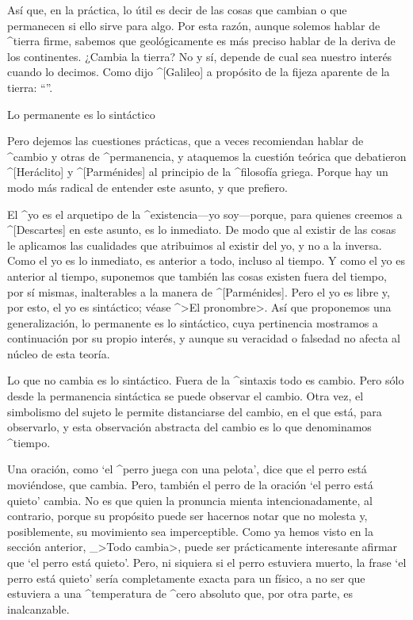 Así que, en la práctica, lo útil es decir de las cosas que cambian o que
permanecen si ello sirve para algo. Por esta razón, aunque solemos
hablar de ^{tierra} firme, sabemos que geológicamente es más preciso
hablar de la deriva de los continentes. ¿Cambia la tierra? No y sí,
depende de cual sea nuestro interés cuando lo decimos. Como dijo
^[Galileo] a propósito de la fijeza aparente de la tierra:
``''.


\Section Lo permanente es lo sintáctico

Pero dejemos las cuestiones prácticas, que a veces recomiendan hablar de
^{cambio} y otras de ^{permanencia}, y ataquemos la cuestión teórica que
debatieron ^[Heráclito] y ^[Parménides] al principio de la ^{filosofía}
griega. Porque hay un modo más radical de entender este asunto, y que
prefiero.

El ^{yo} es el arquetipo de la ^{existencia}---yo soy---porque, para
quienes creemos a ^[Descartes] en este asunto, es lo inmediato. De modo
que al existir de las cosas le aplicamos las cualidades que atribuimos
al existir del yo, y no a la inversa. Como el yo es lo inmediato, es
anterior a todo, incluso al tiempo. Y como el yo es anterior al tiempo,
suponemos que también las cosas existen fuera del tiempo, por sí mismas,
inalterables a la manera de ^[Parménides]. Pero el yo es libre y, por
esto, el yo es sintáctico; véase ^>El pronombre>. Así que proponemos una
generalización, lo permanente es lo sintáctico, cuya pertinencia
mostramos a continuación por su propio interés, y aunque su veracidad o
falsedad no afecta al núcleo de esta teoría.

Lo que no cambia es lo sintáctico. Fuera de la ^{sintaxis} todo es
cambio. Pero sólo desde la permanencia sintáctica se puede observar el
cambio. Otra vez, el simbolismo del sujeto le permite distanciarse del
cambio, en el que está, para observarlo, y esta observación abstracta
del cambio es lo que denominamos ^{tiempo}.

Una oración, como `el ^{perro} juega con una pelota', dice que el perro
está moviéndose, que cambia. Pero, también el perro de la oración `el
perro está quieto' cambia. No es que quien la pronuncia mienta
intencionadamente, al contrario, porque su propósito puede ser hacernos
notar que no molesta y, posiblemente, su movimiento sea imperceptible.
Como ya hemos visto en la sección anterior, _>Todo cambia>, puede ser
prácticamente interesante afirmar que `el perro está quieto'. Pero, ni
siquiera si el perro estuviera muerto, la frase `el perro está quieto'
sería completamente exacta para un físico, a no ser que estuviera a una
^{temperatura} de ^{cero} absoluto que, por otra parte, es inalcanzable.

